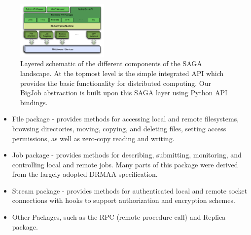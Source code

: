 \documentclass[conference,final]{IEEEtran}
\newcommand{\up}{\vspace*{-1em}}
\begin{document}
\up
\begin{figure}[!ht]
 \begin{center}
     \includegraphics[width=0.40\textwidth]{stci_saga_figures-1.pdf}
 \end{center}
\caption{\small Layered schematic of the different components of the
   SAGA landscape. At the topmost level is the simple integrated API
   which provides the basic functionality for distributed
   computing. Our BigJob abstraction is built upon this SAGA layer
   using Python API bindings.\up} \label{Fig:SAGA1}
\end{figure}

\begin{itemize}
\item File package - provides methods for accessing local and remote
 filesystems, browsing directories, moving, copying, and deleting
 files, setting access permissions, as well as zero-copy reading and
 writing.
\item Job package - provides methods for describing, submitting,
 monitoring, and controlling local and remote jobs. Many parts of
 this package were derived from the largely adopted
 DRMAA %
 specification.
\item Stream package - provides methods for authenticated local and
 remote socket connections with hooks to support authorization and
 encryption schemes.
\item Other Packages, such as the RPC (remote procedure call) and Replica
 package.
\end{itemize}
\end{document}

